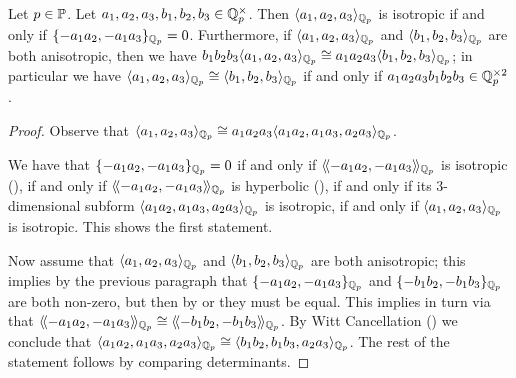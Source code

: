 \documentclass[12pt, leqno, british]{amsart}
\begin{document}
\begin{prop}\label{P:classify-3-dimensional-qqp}
Let $p \in \mathbb P$.
Let $a_1, a_2, a_3, b_1, b_2, b_3 \in \mathbb Q_p^\times$.
Then $\langle a_1, a_2, a_3 \rangle_{\mathbb Q_p}$ is isotropic if and only if $\lbrace -a_1a_2, -a_1a_3 \rbrace_{\mathbb Q_p} = 0$.
Furthermore, if $\langle a_1, a_2, a_3 \rangle_{\mathbb Q_p}$ and $\langle b_1, b_2, b_3 \rangle_{\mathbb Q_p}$ are both anisotropic, then we have $b_1b_2b_3\langle a_1, a_2, a_3 \rangle_{\mathbb Q_p} \cong a_1a_2a_3\langle b_1, b_2, b_3 \rangle_{\mathbb Q_p}$; in particular we have $\langle a_1, a_2, a_3 \rangle_{\mathbb Q_p} \cong \langle b_1, b_2, b_3 \rangle_{\mathbb Q_{p}}$ if and only if $a_1a_2a_3b_1b_2b_3 \in \mathbb Q_p^{\times 2}$.
\end{prop}
\begin{proof}
Observe that $\langle a_1, a_2, a_3 \rangle_{\mathbb Q_p} \cong a_1a_2a_3\langle a_1a_2, a_1a_3, a_2a_3\rangle_{\mathbb Q_p}$.

We have that $\lbrace -a_1a_2, -a_1a_3 \rbrace_{\mathbb Q_p} = 0$ if and only if $\langle\!\langle -a_1a_2, -a_1a_3 \rangle\!\rangle_{\mathbb Q_p}$ is isotropic (), if and only if $\langle\!\langle -a_1a_2, -a_1a_3 \rangle\!\rangle_{\mathbb Q_p}$ is hyperbolic (), if and only if its $3$-dimensional subform $\langle a_1a_2, a_1a_3, a_2a_3 \rangle_{\mathbb Q_p}$ is isotropic, if and only if $\langle a_1, a_2, a_3 \rangle_{\mathbb Q_p}$ is isotropic.
This shows the first statement.

Now assume that $\langle a_1, a_2, a_3 \rangle_{\mathbb Q_p}$ and $\langle b_1, b_2, b_3 \rangle_{\mathbb Q_p}$ are both anisotropic; this implies by the previous paragraph that $\lbrace -a_1a_2, -a_1a_3 \rbrace_{\mathbb Q_p}$ and $\lbrace -b_1b_2, -b_1b_3 \rbrace_{\mathbb Q_p}$ are both non-zero, but then by  or  they must be equal.
This implies in turn via  that $\langle\!\langle -a_1a_2, -a_1a_3 \rangle\!\rangle_{\mathbb Q_p} \cong \langle\!\langle -b_1b_2, -b_1b_3 \rangle\!\rangle_{\mathbb Q_p}$.
By Witt Cancellation () we conclude that $\langle a_1a_2, a_1a_3, a_2a_3\rangle_{\mathbb Q_p} \cong \langle b_1b_2, b_1b_3, a_2a_3\rangle_{\mathbb Q_p}$.
The rest of the statement follows by comparing determinants.
\end{proof}
\end{document}
